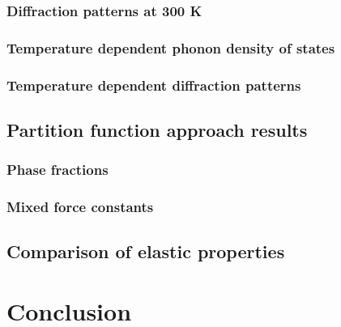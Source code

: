 \subsubsection{Diffraction patterns at 300 K}

\subsubsection{Temperature dependent phonon density of states }

\subsubsection{Temperature dependent diffraction patterns}

\subsection{Partition function approach results}

\subsubsection{Phase fractions}

\subsubsection{Mixed force constants}

\subsection{Comparison of elastic properties}

\section{Conclusion}




